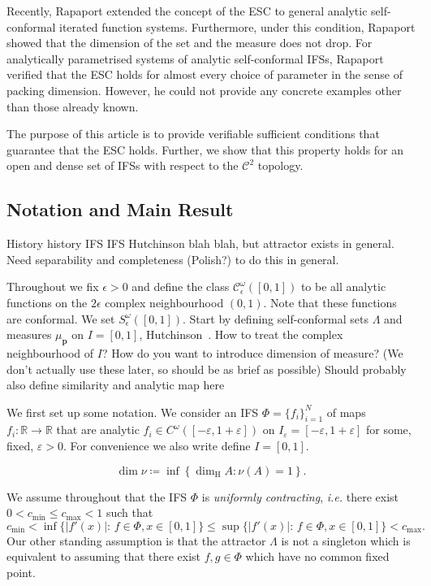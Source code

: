 \documentclass[12pt,]{article}
\theoremstyle{definition}
\theoremstyle{remark}
\renewcommand{\Bbb}[1]{\mathbb{#1}}
\newcommand{\bbR}{{\Bbb R}}        %
\newcommand{\0}{\mathbf{0}}
\newcommand{\ie}{{\it i.e.}\/ }
\newcommand{\eps}{\varepsilon}
\begin{document}
{Recently, Rapaport \cite{Rapaport_SelfConfESC25arXiv} extended the concept of the ESC to general
analytic self-conformal iterated function systems. Furthermore, under this condition, Rapaport
showed that the dimension of the set and the measure does not drop.
For analytically parametrised systems of analytic self-conformal IFSs, Rapaport verified that the
ESC holds for almost every choice of parameter in the sense of packing dimension.
However, he could not provide any concrete examples other than those already known.

The purpose of this article is to provide verifiable sufficient conditions that guarantee that the
ESC holds. Further, we show that this property holds for an open and dense set of IFSs with respect to the
$\mathcal{C}^2$ topology.

\subsection{Notation and Main Result}


{\color{red}
  History history IFS IFS Hutchinson blah blah, but attractor exists in general. Need separability
  and completeness (Polish?) to do this in general.

  Throughout we fix $\epsilon>0$ and define the class $\mathcal{C}^\omega_\epsilon([0,1])$ to be all
  analytic functions on the $2\epsilon$ complex neighbourhood $(0,1)$. Note that these functions are
  conformal. We set $S^\omega_\epsilon([0,1])$.
Start by defining self-conformal sets $\Lambda$ and measures $\mu_{\mathbf{p}}$ on $I=[0,1]$, Hutchinson~\cite{Hutchinson_Attractor_81}. How to treat the complex neighbourhood of $I$? How do you want to introduce dimension of measure? (We don't actually use these later, so should be as brief as possible) Should probably also define similarity and analytic map here

We first set up some notation. We consider an IFS $\Phi=\{f_i\}_{i=1}^N$ of maps $f_i:\bbR\to\bbR$
that are analytic $f_i \in C^\omega([-\eps,1+\eps])$ on $I_{\eps}=[-\eps,1+\eps]$ for some, fixed, $\eps>0$.
For convenience we also write define $I=[0,1]$.


\begin{equation*}
	\dim \nu\coloneqq\inf \left\{\dim_{\mathrm{H}} A: \nu(A)=1\right\} .
\end{equation*}
}


We assume throughout that the IFS $\Phi$ is \emph{uniformly contracting}, \ie there exist $0<c_{\min} \leq c_{\max}<1$ such that 
\[
c_{\min} < \inf\big\{ |f'(x)|:\, f\in\Phi, x\in[0,1] \big\} \leq \sup\big\{ |f'(x)|:\, f\in\Phi, x\in[0,1] \big\} < c_{\max}.
\]
Our other standing assumption is that the attractor $\Lambda$ is not a singleton which is equivalent to assuming that there exist $f,g\in\Phi$ which have no common fixed point. 

}
\end{document}
